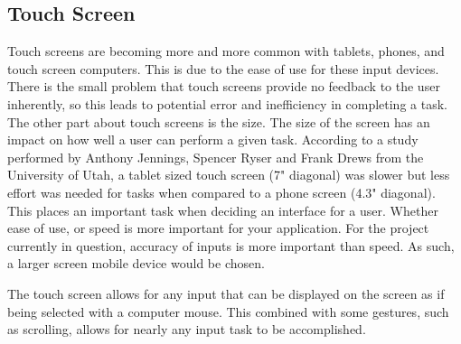 \documentclass[10pt,draftclsnofoot,onecolumn,letterpaper]{IEEEtran}
\begin{document}
\subsection{Touch Screen}
Touch screens are becoming more and more common with tablets, phones, and touch screen computers. This is due to the ease of use for these input devices. There is the small problem that touch screens provide no feedback to the user inherently, so this leads to potential error and inefficiency in completing a task\cite{TouchScreen}. The other part about touch screens is the size. The size of the screen has an impact on how well a user can perform a given task. According to a study performed by Anthony Jennings, Spencer Ryser and Frank Drews from the University of Utah, a tablet sized touch screen (7" diagonal) was slower but less effort was needed for tasks when compared to a phone screen (4.3" diagonal)\cite{TouchScreen}. This places an important task when deciding an interface for a user. Whether ease of use, or speed is more important for your application. For the project currently in question, accuracy of inputs is more important than speed. As such, a larger screen mobile device would be chosen.\par
The touch screen allows for any input that can be displayed on the screen as if being selected with a computer mouse. This combined with some gestures, such as scrolling, allows for nearly any input task to be accomplished.\par
\end{document}
